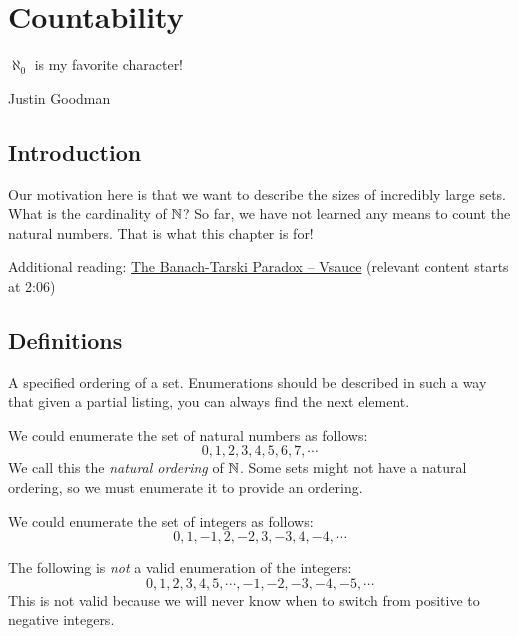 \documentclass[main.tex]{subfiles}
\begin{document}
\chapter{Countability}
\label{chapter:countability}

\epigraph{\(\aleph_0\) is my favorite character!}{Justin Goodman}

\minitoc

\section{Introduction}

Our motivation here is that we want to describe the sizes of incredibly large sets. What is the cardinality of \(\mathbb{N}\)? So far, we have not learned any means to count the natural numbers. That is what this chapter is for!

Additional reading: \href{https://youtu.be/s86-Z-CbaHA}{The Banach-Tarski Paradox -- Vsauce} (relevant content starts at 2:06)

\section{Definitions}

\begin{defn}
	A specified ordering of a set. Enumerations should be described in such a way that given a partial listing, you can always find the next element.
\end{defn}

\begin{example}
	We could enumerate the set of natural numbers as follows: \[0,1,2,3,4,5,6,7,\cdots\]
	We call this the \textit{natural ordering} of \(\mathbb{N}\). Some sets might not have a natural ordering, so we must enumerate it to provide an ordering.
\end{example}

\begin{example}
	We could enumerate the set of integers as follows: \[0,1,-1,2,-2,3,-3,4,-4,\cdots\]
\end{example}

\begin{example}
	The following is \textit{not} a valid enumeration of the integers: \[0,1,2,3,4,5,\cdots,-1,-2,-3,-4,-5,\cdots\]
	This is not valid because we will never know when to switch from positive to negative integers.
\end{example}
\end{document}
